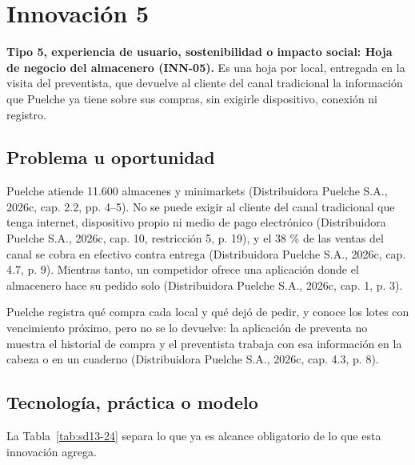 \section{Innovación 5}

\textbf{Tipo 5, experiencia de usuario, sostenibilidad o impacto social: Hoja de negocio del almacenero (INN-05).} Es una hoja por local, entregada en la visita del preventista, que devuelve al cliente del canal tradicional la información que Puelche ya tiene sobre sus compras, sin exigirle dispositivo, conexión ni registro.

\subsection{Problema u oportunidad}

Puelche atiende 11.600 almacenes y minimarkets (Distribuidora Puelche S.A., 2026c, cap. 2.2, pp. 4--5). No se puede exigir al cliente del canal tradicional que tenga internet, dispositivo propio ni medio de pago electrónico (Distribuidora Puelche S.A., 2026c, cap. 10, restricción 5, p. 19), y el 38 \% de las ventas del canal se cobra en efectivo contra entrega (Distribuidora Puelche S.A., 2026c, cap. 4.7, p. 9). Mientras tanto, un competidor ofrece una aplicación donde el almacenero hace su pedido solo (Distribuidora Puelche S.A., 2026c, cap. 1, p. 3).

Puelche registra qué compra cada local y qué dejó de pedir, y conoce los lotes con vencimiento próximo, pero no se lo devuelve: la aplicación de preventa no muestra el historial de compra y el preventista trabaja con esa información en la cabeza o en un cuaderno (Distribuidora Puelche S.A., 2026c, cap. 4.3, p. 8).

\subsection{Tecnología, práctica o modelo}

La Tabla~\ref{tab:sd13-24} separa lo que ya es alcance obligatorio de lo que esta innovación agrega.

